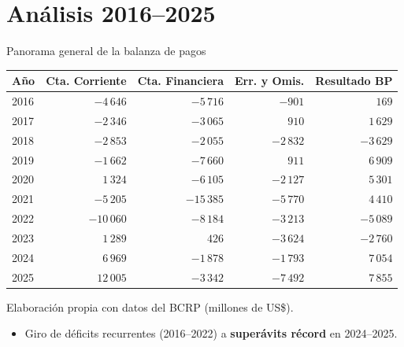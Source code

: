 \documentclass[10pt,aspectratio=169]{beamer}
\begin{document}
\section{Análisis 2016--2025}
\begin{frame}{Panorama general de la balanza de pagos}
  \centering
  \scriptsize
  \setlength{\tabcolsep}{5pt}\renewcommand{\arraystretch}{1.05}
  \begin{tabular}{lrrrr}
    \toprule
    \textbf{Año} & \textbf{Cta. Corriente} & \textbf{Cta. Financiera} & \textbf{Err. y Omis.} & \textbf{Resultado BP} \\
    \midrule
    2016 & $-4\,646$ & $-5\,716$ & $-901$ & $169$ \\
    2017 & $-2\,346$ & $-3\,065$ & $910$ & $1\,629$ \\
    2018 & $-2\,853$ & $-2\,055$ & $-2\,832$ & $-3\,629$ \\
    2019 & $-1\,662$ & $-7\,660$ & $911$ & $6\,909$ \\
    2020 & $1\,324$ & $-6\,105$ & $-2\,127$ & $5\,301$ \\
    2021 & $-5\,205$ & $-15\,385$ & $-5\,770$ & $4\,410$ \\
    2022 & $-10\,060$ & $-8\,184$ & $-3\,213$ & $-5\,089$ \\
    2023 & $1\,289$ & $426$ & $-3\,624$ & $-2\,760$ \\
    2024 & $6\,969$ & $-1\,878$ & $-1\,793$ & $7\,054$ \\
    2025 & $12\,005$ & $-3\,342$ & $-7\,492$ & $7\,855$ \\
    \bottomrule
  \end{tabular}
  \vspace{0.6em}
  \begin{flushright}\tiny Elaboración propia con datos del BCRP (millones de US\$).\end{flushright}
  \normalsize
  \begin{itemize}\footnotesize
    \item Giro de déficits recurrentes (2016--2022) a \textbf{superávits récord} en 2024--2025.
  \end{itemize}
\end{frame}
\end{document}
